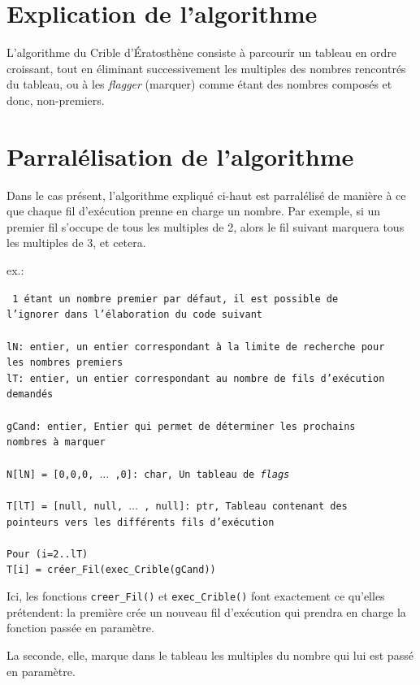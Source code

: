 \documentclass{report}
\def\code#1{\texttt{#1}} %
\def\comment#1{\color{gray} #1 \color{black}}
\begin{document}
	\section{Explication de l'algorithme}
	
		L'algorithme du Crible d'Ératosthène consiste à parcourir un tableau 
		en ordre croissant, tout en éliminant successivement les multiples des 
		nombres rencontrés du tableau, ou à les {\it flagger} (marquer) comme 
		étant des nombres composés et donc, non-premiers.
		
	\bigskip		
	\section{Parralélisation de l'algorithme}

		Dans le cas présent, l'algorithme expliqué ci-haut est parralélisé de 
		manière à ce que chaque fil d'exécution prenne en charge un nombre. 
		Par exemple, si un premier fil s'occupe de tous les multiples de 2, 
		alors le fil suivant marquera tous les multiples de 3, et cetera.
		
		\bigskip
		\noindent ex.:
		
		\noindent
		\code{
			\comment{
			1 étant un nombre premier par défaut, il est possible de \\l'ignorer 
			dans l'élaboration du code suivant
			} \\	
			\\
			lN: entier, \comment{un entier correspondant à la limite de recherche 
			pour \\les nombres premiers}\\
			lT: entier, \comment{un entier correspondant au nombre de fils 
			d'exécution \\demandés} \\
			\\
			gCand: entier, \comment{Entier qui permet de déterminer les prochains
			\\nombres à marquer} \\
			\\
			N[lN] = [0,0,0, $\ldots$ ,0]: char, \comment{Un tableau de {\it flags}} \\
			\\
			T[lT] = [null, null, $\ldots$ , null]: ptr, \comment{Tableau contenant 
			des \\pointeurs vers les différents fils d'exécution} \\
			\\
			Pour (i=2..lT) \\
			\hspace*{16pt} T[i] = créer\_Fil(exec\_Crible(gCand))
		}
		
		\bigskip
		Ici, les fonctions \code{creer\_Fil()} et \code{exec\_Crible()}
		font exactement ce qu'elles prétendent: la première crée un nouveau fil 
		d'exécution qui prendra en charge la fonction passée en paramètre.
		
		\smallskip
		La seconde, elle, marque dans le tableau les multiples du nombre qui 
		lui est passé en paramètre. 
		
\end{document}
